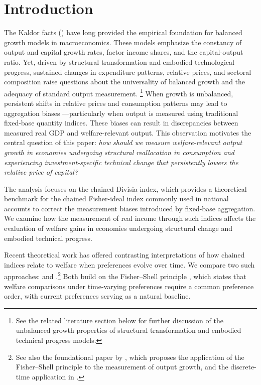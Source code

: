 \documentclass[12pt,a4paper]{article}
\begin{document}
\newpage



\section{Introduction}
The Kaldor facts (\citet{kaldor1961capital}) have long provided the empirical foundation for balanced growth models in macroeconomics. 
These models emphasize the constancy of output and capital growth rates, factor income shares, and the capital-output ratio. 
Yet, driven by structural transformation and embodied technological progress, sustained changes in expenditure patterns, relative prices, and sectoral composition raise questions about the universality of balanced growth and the adequacy of standard output measurement.%
\footnote{See the related literature section below for further discussion of the unbalanced growth properties of structural transformation and embodied technical progress models.}
When growth is unbalanced, persistent shifts in relative prices and consumption patterns may lead to aggregation biases —particularly when output is measured using traditional fixed-base quantity indices. These biases can result in discrepancies between measured real GDP and welfare-relevant output. This observation motivates the central question of this paper: \textit{how should we measure welfare-relevant output growth in economies undergoing structural reallocation in consumption and experiencing investment-specific technical change that persistently lowers the relative price of capital?}

The analysis focuses on the chained Divisia index, which provides a theoretical benchmark for the chained Fisher-ideal index commonly used in national accounts to correct the measurement biases introduced by fixed-base aggregation. We examine how the measurement of real income through such indices affects the evaluation of welfare gains in economies undergoing structural change and embodied technical progress.

Recent theoretical work has offered contrasting interpretations of how chained indices relate to welfare when preferences evolve over time. We compare two such approaches: \citet{BB2023welfare} and \citet{duran_licandro_2024}.\footnote{See also the foundational paper by \citet{Licandro_RuizCastillo_Duran}, which proposes the application of the Fisher–Shell principle to the measurement of output growth, and the discrete-time application in \citet{Duernecker_et_al_2021}.} Both build on the Fisher–Shell principle \citep{fisher_shell_1968}, which states that welfare comparisons under time-varying preferences require a common preference order, with current preferences serving as a natural baseline. 
\end{document}
